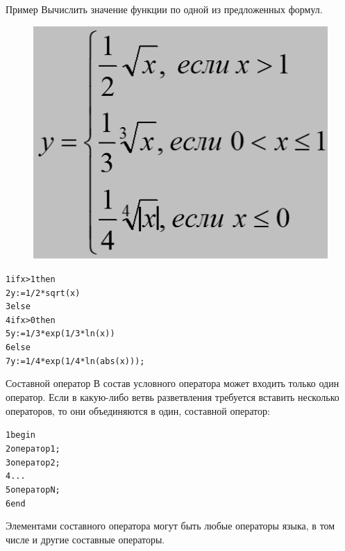 \documentclass{beamer}
\begin{document}
\begin{frame}[fragile]{Пример}
Вычислить значение функции по одной из предложенных формул.
\begin{figure}[h]
\centering
\includegraphics[scale=0.35]{images/lec03-pic07.png}
\end{figure}
\begin{alltt}
1 if x > 1 then
2    y := 1/2 * sqrt(x)
3 else
4   if x > 0 then
5     y := 1/3 * exp(1/3*ln(x))
6   else
7     y := 1/4 * exp(1/4*ln(abs(x)));
\end{alltt}
\end{frame}

\begin{frame}[fragile]{Составной оператор}
В состав условного оператора может входить только один оператор. Если в какую-либо ветвь разветвления требуется вставить несколько операторов, то они объединяются в один, составной оператор:
\begin{alltt}
1 begin
2   оператор1;
3   оператор2;
4   ...
5   операторN;
6 end
\end{alltt}
Элементами составного оператора могут быть любые операторы языка, в том числе и другие составные операторы.
\end{frame}
\end{document}
